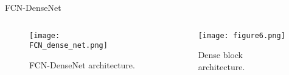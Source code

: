 \documentclass[10pt,aspectratio=169,dvipsnames]{beamer} %
\newcounter{angle}
\begin{document}
	\begin{frame}{FCN-DenseNet}
		\begin{columns}[T]
			\begin{column}[c]{0.48\textwidth}
				\begin{figure}[h!]
					\texttt{[image: FCN\_dense\_net.png]}
					\caption{FCN-DenseNet architecture.} 
					\label{fcn}
				\end{figure}
			\end{column}
			\hfill
			\begin{column}[c]{0.48\textwidth}
				\begin{figure}[h!]
					\centering
					\texttt{[image: figure6.png]}
					\caption{Dense block architecture.} 
				\end{figure}
			\end{column}
		\end{columns}
	\end{frame}
\end{document}
